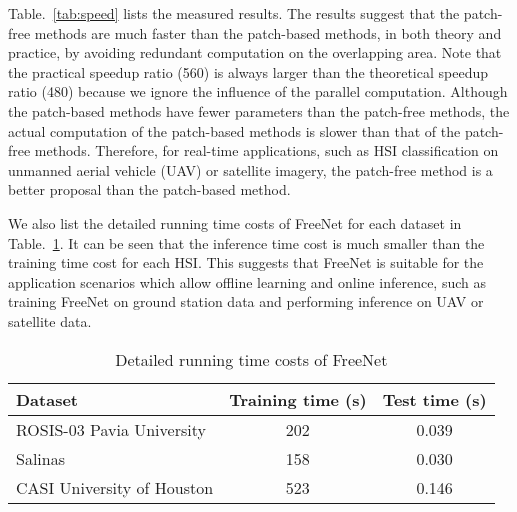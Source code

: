 \documentclass[journal]{IEEEtran}
\begin{document}
Table.~\ref{tab:speed} lists the measured results.
The results suggest that the patch-free methods are much faster than the patch-based methods, in both theory and practice, by avoiding redundant computation on the overlapping area.
Note that the practical speedup ratio (560) is always larger than the theoretical speedup ratio (480) because we ignore the influence of the parallel computation.
Although the patch-based methods have fewer parameters than the patch-free methods, the actual computation of the patch-based methods is slower than that of the patch-free methods.
Therefore, for real-time applications, such as HSI classification on unmanned aerial vehicle (UAV) or satellite imagery, the patch-free method is a better proposal than the patch-based method.


We also list the detailed running time costs of FreeNet for each dataset in Table.~\ref{tab:runingtime}.
It can be seen that the inference time cost is much smaller than the training time cost for each HSI.
This suggests that FreeNet is suitable for the application scenarios which allow offline learning and online inference, such as training FreeNet on ground station data and performing inference on UAV or satellite data.  

\begin{table}[]
  \caption{
    Detailed running time costs of FreeNet
    \label{tab:runingtime}}
  \centering
  \renewcommand{\arraystretch}{1.5}
  \begin{tabular}{l|c|c}
    \hline
    Dataset                    & Training time (s) & Test time (s) \\ \hline
    ROSIS-03 Pavia University  & 202               & 0.039         \\
    Salinas                    & 158               & 0.030         \\
    CASI University of Houston & 523               & 0.146         \\ \hline
  \end{tabular}
\end{table}
\end{document}
